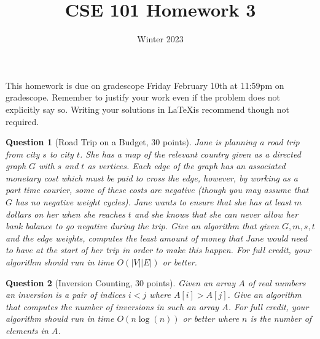 \documentclass{article}
\title{CSE 101 Homework 3}
\date{Winter 2023}
\newtheorem{ques}{Question}
\begin{document}
\maketitle

This homework is due on gradescope Friday February 10th at 11:59pm on gradescope. Remember to justify your work even if the problem does not explicitly say so. Writing your solutions in \LaTeX is recommend though not required.

\begin{ques}[Road Trip on a Budget, 30 points]
Jane is planning a road trip from city $s$ to city $t$. She has a map of the relevant country given as a directed graph $G$ with $s$ and $t$ as vertices. Each edge of the graph has an associated monetary cost which must be paid to cross the edge, however, by working as a part time courier, some of these costs are negative (though you may assume that $G$ has no negative weight cycles). Jane wants to ensure that she has at least $m$ dollars on her when she reaches $t$ and she knows that she can never allow her bank balance to go negative during the trip. Give an algorithm that given $G,m,s,t$ and the edge weights, computes the least amount of money that Jane would need to have at the start of her trip in order to make this happen. For full credit, your algorithm should run in time $O(|V||E|)$ or better.
\end{ques}

\begin{ques}[Inversion Counting, 30 points]
Given an array $A$ of real numbers an \emph{inversion} is a pair of indices $i<j$ where $A[i] > A[j]$. Give an algorithm that computes the number of inversions in such an array $A$. For full credit, your algorithm should run in time $O(n\log(n))$ or better where $n$ is the number of elements in $A$.
\end{ques}
\end{document}
